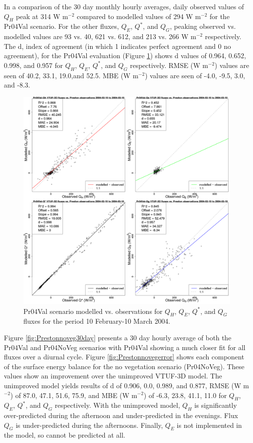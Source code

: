 \documentclass[final,3p,times,authoryear]{elsarticle}
\begin{document}
In a comparison of the 30 day monthly hourly averages, daily observed values of $Q_{H}$ peak at 314 W m$^{-2}$ compared to modelled values of 294 W m$^{-2}$ for the Pr04Val scenario. For the other fluxes, $Q_{E}$, $Q^{*}$, and $Q_{G}$, peaking observed vs. modelled values are 93 vs. 40, 621 vs. 612, and 213 vs. 266 W m$^{-2}$ respectively. The d, index of agreement (in which 1 indicates perfect agreement and 0 no agreement), for the Pr04Val evaluation (Figure \ref{fig:Preston6error}) shows d values of 0.964, 0.652, 0.998, and 0.957 for $Q_{H}$, $Q_{E}$, $Q^{*}$, and $Q_{G}$ respectively. RMSE (W m$^{-2}$) values are seen of 40.2, 33.1, 19.0,and 52.5. MBE (W m$^{-2}$) values are seen of -4.0, -9.5, 3.0, and -8.3. 

\begin{figure}[!htbp]
\includegraphics[trim = 0mm 0mm 0mm 0mm, clip, scale=0.30]{images/Pr04Val-ErrorPlots.png}
\caption{Pr04Val scenario modelled vs. observations for $Q_{H}$, $Q_{E}$, $Q^{*}$, and $Q_{G}$ fluxes for the period 10 February-10 March 2004. \label{fig:Preston6error}}   
\end{figure}

Figure \ref{fig:Prestonnoveg30day} presents a 30 day hourly average of both the Pr04Val and Pr04NoVeg scenarios with Pr04Val showing a much closer fit for all fluxes over a diurnal cycle. Figure \ref{fig:Prestonnovegerror} shows each component of the surface energy balance for the no vegetation scenario (Pr04NoVeg). These values show an improvement over the unimproved VTUF-3D model. The unimproved model yields results of d of 0.906, 0.0, 0.989, and 0.877, RMSE (W m$^{-2}$) of 87.0, 47.1, 51.6, 75.9, and MBE (W m$^{-2}$) of -6.3, 23.8, 41.1, 11.0 for $Q_{H}$, $Q_{E}$, $Q^{*}$, and $Q_{G}$ respectively. With the unimproved model, $Q_{H}$ is significantly over-predicted during the afternoon and under-predicted in the evenings. Flux $Q_{G}$ is under-predicted during the afternoons. Finally, $Q_{E}$ is not implemented in the model, so cannot be predicted at all. 
\end{document}
